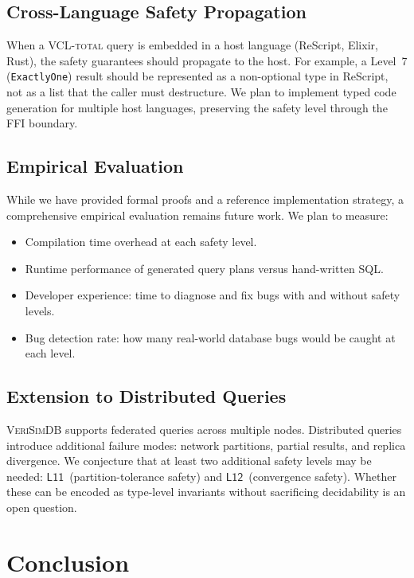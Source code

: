 \documentclass[11pt,a4paper]{article}
\newcommand{\VCL}{\textsc{VCL-total}}
\newcommand{\VeriSimDB}{\textsc{VeriSimDB}}
\newcommand{\LevelN}[1]{\textsf{L#1}}
\begin{document}
\subsection{Cross-Language Safety Propagation}

When a \VCL{} query is embedded in a host language (ReScript, Elixir,
Rust), the safety guarantees should propagate to the host.  For
example, a Level~7 (\texttt{ExactlyOne}) result should be represented
as a non-optional type in ReScript, not as a list that the caller
must destructure.  We plan to implement typed code generation for
multiple host languages, preserving the safety level through the FFI
boundary.

\subsection{Empirical Evaluation}

While we have provided formal proofs and a reference implementation
strategy, a comprehensive empirical evaluation remains future work.
We plan to measure:
\begin{itemize}[nosep]
  \item Compilation time overhead at each safety level.
  \item Runtime performance of generated query plans versus hand-written SQL.
  \item Developer experience: time to diagnose and fix bugs with and
    without safety levels.
  \item Bug detection rate: how many real-world database bugs would be
    caught at each level.
\end{itemize}

\subsection{Extension to Distributed Queries}

\VeriSimDB{} supports federated queries across multiple nodes.
Distributed queries introduce additional failure modes: network
partitions, partial results, and replica divergence.  We conjecture
that at least two additional safety levels may be needed:
$\LevelN{11}$~(partition-tolerance safety) and
$\LevelN{12}$~(convergence safety).  Whether these can be encoded
as type-level invariants without sacrificing decidability is an
open question.

\section{Conclusion}\label{sec:conclusion}
\end{document}
